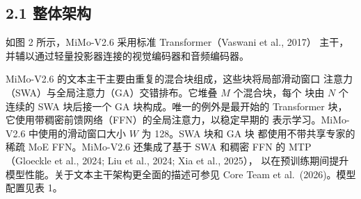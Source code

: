 \subsection{2.1 整体架构}\label{overall-architecture}

如图 2 所示，MiMo-V2.6 采用标准 Transformer（Vaswani et al., 2017）
主干，并辅以通过轻量投影器连接的视觉编码器和音频编码器。

MiMo-V2.6 的文本主干主要由重复的混合块组成，这些块将局部滑动窗口
注意力（SWA）与全局注意力（GA）交错排布。它堆叠 $M$ 个混合块，每个
块由 $N$ 个连续的 SWA 块后接一个 GA 块构成。唯一的例外是最开始的
Transformer 块，它使用带稠密前馈网络（FFN）的全局注意力，以稳定早期的
表示学习。MiMo-V2.6 中使用的滑动窗口大小 $W$ 为 128。SWA 块和 GA 块
都使用不带共享专家的稀疏 MoE FFN。MiMo-V2.6 还集成了基于 SWA 和稠密
FFN 的 MTP（Gloeckle et al., 2024; Liu et al., 2024; Xia et al., 2025），
以在预训练期间提升模型性能。关于文本主干架构更全面的描述可参见
Core Team et al.~(2026)。模型配置见表 1。
